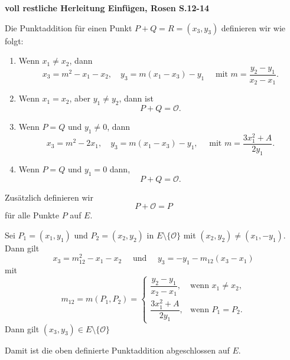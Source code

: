 \textbf{voll restliche Herleitung Einfügen, Rosen S.12-14}
\begin{definition}[Punktaddition]
    \label{def:punktaddition}
    Die Punktaddition für einen Punkt $P+Q=R=(x_3,y_3)$ definieren wir wie folgt:
    \begin{enumerate}
        \item Wenn $x_1\neq x_2$, dann
              \[x_3=m^2-x_1-x_2, \quad y_3=m(x_1-x_3)-y_1 \quad \text{ mit  } m=\frac{y_2-y_1}{x_2-x_1}.\]
        \item Wenn $x_1=x_2$, aber $y_1\neq y_2$, dann ist
              \[P+Q=\mathcal{O}.\]
        \item Wenn $P=Q$ und $y_1\neq 0$, dann
              \[x_3=m^2-2x_1, \quad y_3=m(x_1-x_3)-y_1, \quad \text{ mit } m=\frac{3x_1^2+A}{2y_1}.\]
        \item Wenn $P=Q$ und $y_1=0$ dann,
              \[P+Q=\mathcal{O}.\]
    \end{enumerate}

    Zusätzlich definieren wir
    \[P+\mathcal{O}=P\]
    für alle Punkte $P$ auf $E$.
\end{definition}


\begin{lemma}
    \label{lem:wohldefiniertheit}
    Sei \(P_1=(x_1,y_1)\) und \(P_2=(x_2,y_2)\) in $E\setminus \{\mathcal{O}\}$ mit \((x_2,y_2)\neq (x_1,-y_1)\). Dann gilt
    \[
        x_3 = m_{12}^2-x_1-x_2 \quad \text{ und } \quad y_3=-y_1-m_{12}(x_3-x_1)
    \]
    mit
    \[
        m_{12}=m(P_1,P_2)=
        \begin{cases}
            \dfrac{y_2-y_1}{x_2-x_1}, & \text{wenn } x_1 \neq x_2, \\[6pt]
            \dfrac{3x_1^2+A}{2y_1},   & \text{wenn } P_1=P_2.
        \end{cases}
    \]
    Dann gilt $(x_3,y_3)\in E\setminus \{\mathcal{O}\}$
\end{lemma}

Damit ist die oben definierte Punktaddition abgeschlossen auf \(E\).

